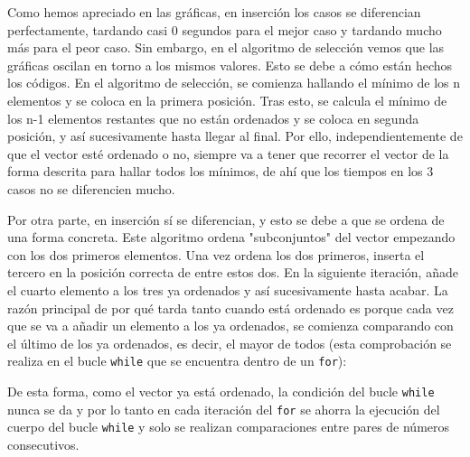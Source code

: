 \documentclass[10pt,a4paper]{article}
\begin{document}
Como hemos apreciado en las gráficas, en inserción los casos se diferencian perfectamente, tardando casi 0 segundos para el mejor caso y tardando mucho más para el peor caso. Sin embargo, en el algoritmo de selección vemos que las gráficas oscilan en torno a los mismos valores. Esto se debe a cómo están hechos los códigos. En el algoritmo de selección, se comienza hallando el mínimo de los n elementos y se coloca en la primera posición. Tras esto, se calcula el mínimo de los n-1 elementos restantes que no están ordenados y se coloca en segunda posición, y así sucesivamente hasta llegar al final. Por ello, independientemente de que el vector esté ordenado o no, siempre va a tener que recorrer el vector de la forma descrita para hallar todos los mínimos, de ahí que los tiempos en los 3 casos no se diferencien mucho.

Por otra parte, en inserción sí se diferencian, y esto se debe a que se ordena de una forma concreta. Este algoritmo ordena "subconjuntos" del vector empezando con los dos primeros elementos. Una vez ordena los dos primeros, inserta el tercero en la posición correcta de entre estos dos. En la siguiente iteración, añade el cuarto elemento a los tres ya ordenados y así sucesivamente hasta acabar. La razón principal de por qué tarda tanto cuando está ordenado es porque cada vez que se va a añadir un elemento a los ya ordenados, se comienza comparando con el último de los ya ordenados, es decir, el mayor de todos (esta comprobación se realiza en el bucle \texttt{while} que se encuentra dentro de un \texttt{for}):



De esta forma, como el vector ya está ordenado, la condición del bucle \texttt{while} nunca se da y por lo tanto en cada iteración del \texttt{for} se ahorra la ejecución del cuerpo del bucle \texttt{while} y solo se realizan comparaciones entre pares de números consecutivos.
\end{document}
